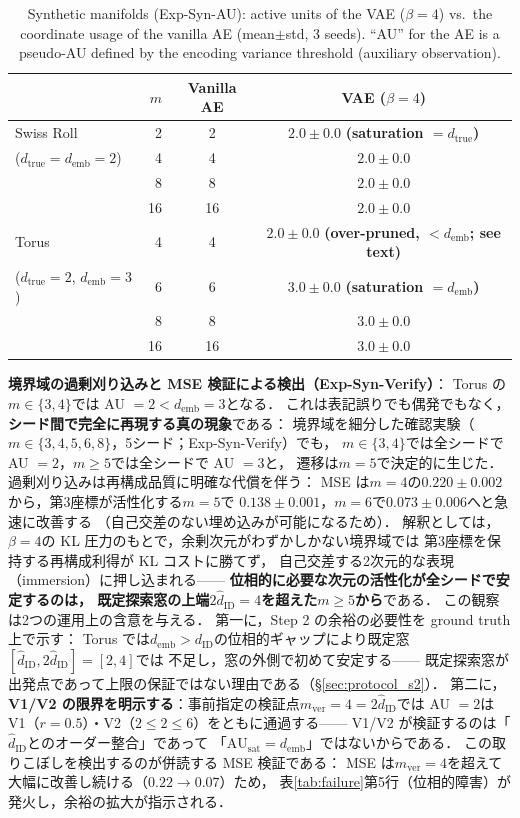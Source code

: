 \documentclass[11pt,a4paper]{jsarticle}
\newcommand{\dID}{d_{\mathrm{ID}}}
\newcommand{\hatdID}{\hat{d}_{\mathrm{ID}}}
\newcommand{\dtrue}{d_{\mathrm{true}}}
\newcommand{\AUsat}{\mathrm{AU}_{\mathrm{sat}}}
\newcommand{\demb}{d_{\mathrm{emb}}}
\begin{document}
\begin{table}[H]
\centering
\caption{Synthetic manifolds (Exp-Syn-AU): active units of the VAE
($\beta = 4$) vs.\ the coordinate usage of the vanilla AE
(mean$\pm$std, 3 seeds). ``AU'' for the AE is a pseudo-AU defined by the
encoding variance threshold (auxiliary observation).}
\label{tab:ea}
\small
\begin{tabular}{lrcc}
\toprule
 & $m$ & Vanilla AE & VAE ($\beta = 4$) \\
\midrule
Swiss Roll & 2 & 2 & $2.0 \pm 0.0$ \textbf{(saturation $= \dtrue$)} \\
($\dtrue = \demb = 2$) & 4 & 4 & $2.0 \pm 0.0$ \\
 & 8 & 8 & $2.0 \pm 0.0$ \\
 & 16 & 16 & $2.0 \pm 0.0$ \\
\midrule
Torus & 4 & 4 & $2.0 \pm 0.0$ \textbf{(over-pruned, $< \demb$; see text)} \\
($\dtrue = 2$, $\demb = 3$) & 6 & 6 & $3.0 \pm 0.0$ \textbf{(saturation $= \demb$)} \\
 & 8 & 8 & $3.0 \pm 0.0$ \\
 & 16 & 16 & $3.0 \pm 0.0$ \\
\bottomrule
\end{tabular}
\end{table}

\textbf{境界域の過剰刈り込みと MSE 検証による検出（Exp-Syn-Verify）}：
Torus の$m \in \{3, 4\}$では AU $= 2 < \demb = 3$となる．
これは表記誤りでも偶発でもなく，\textbf{シード間で完全に再現する真の現象}である：
境界域を細分した確認実験（$m \in \{3, 4, 5, 6, 8\}$，5シード；Exp-Syn-Verify）でも，
$m \in \{3, 4\}$では全シードで AU $= 2$，$m \geq 5$では全シードで AU $= 3$と，
遷移は$m = 5$で決定的に生じた．
過剰刈り込みは再構成品質に明確な代償を伴う：
MSE は$m = 4$の$0.220 \pm 0.002$から，第3座標が活性化する$m = 5$で
$0.138 \pm 0.001$，$m = 6$で$0.073 \pm 0.006$へと急速に改善する
（自己交差のない埋め込みが可能になるため）．
解釈としては，$\beta = 4$の KL 圧力のもとで，余剰次元がわずかしかない境界域では
第3座標を保持する再構成利得が KL コストに勝てず，
自己交差する2次元的な表現（immersion）に押し込まれる——
\textbf{位相的に必要な次元の活性化が全シードで安定するのは，
既定探索窓の上端$2\hatdID = 4$を超えた$m \geq 5$から}である．
この観察は2つの運用上の含意を与える．
第一に，Step 2 の余裕の必要性を ground truth 上で示す：
Torus では$\demb > \dID$の位相的ギャップにより既定窓$[\hatdID, 2\hatdID] = [2, 4]$では
不足し，窓の外側で初めて安定する——
既定探索窓が出発点であって上限の保証ではない理由である（§\ref{sec:protocol_s2}）．
第二に，\textbf{V1/V2 の限界を明示する}：事前指定の検証点$m_{\mathrm{ver}} = 4 = 2\hatdID$では
AU $= 2$は V1（$r = 0.5$）・V2（$2 \leq 2 \leq 6$）をともに通過する——
V1/V2 が検証するのは「$\hatdID$とのオーダー整合」であって
「$\AUsat = \demb$」ではないからである．
この取りこぼしを検出するのが併読する MSE 検証である：
MSE は$m_{\mathrm{ver}} = 4$を超えて大幅に改善し続ける（$0.22 \to 0.07$）ため，
表\ref{tab:failure}第5行（位相的障害）が発火し，余裕の拡大が指示される．
\end{document}
